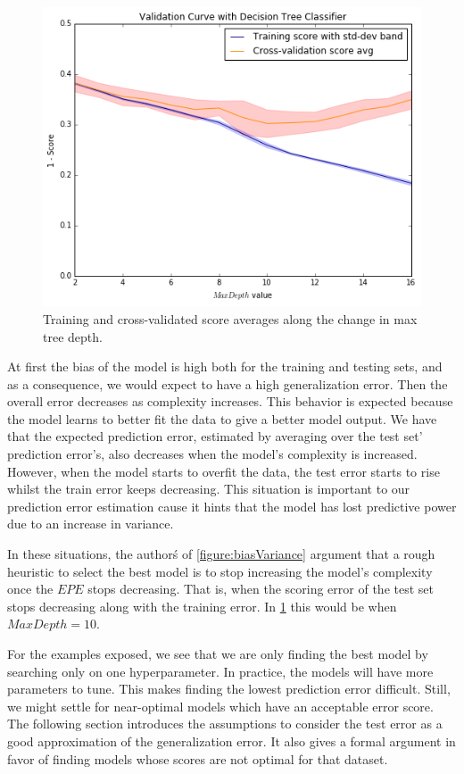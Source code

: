 \begin{figure}[h!]
\begin{center}
\includegraphics[width=0.7\columnwidth]{figures/figure-biasVariance/dtree_overfit_problem_2.png}
\caption{ Training and cross-validated score averages along the change in max tree depth.
}
\label{figure:dtree_overfit_problem_2}
\end{center}
\end{figure}


At first the bias of the model is high both for the training and testing sets, and as a consequence, we would expect to have a high generalization error. Then the overall error decreases as complexity increases. This behavior is expected because the model learns to better fit the data to give a better model output. We have that the expected prediction error, estimated by averaging over the test set' prediction error's, also decreases when the model's complexity is increased. However, when the model starts to overfit the data, the test error starts to rise whilst the train error keeps decreasing. This situation is important to our prediction error estimation cause it hints that the model has lost predictive power due to an increase in variance.

In these situations, the author\'s of \cref{figure:biasVariance} argument that a rough heuristic to select the best model is to stop increasing the model's complexity once the $EPE$ stops decreasing. That is, when the scoring error of the test set stops decreasing along with the training error. In \cref{figure:dtree_overfit_problem_2} this would be when $Max Depth = 10$.

For the examples exposed, we see that we are only finding the best model by searching only on one hyperparameter. In practice, the models will have more parameters to tune. This makes finding the lowest prediction error difficult.
Still, we might settle for near-optimal models which have an acceptable error score. The following section introduces the assumptions to consider the test error as a good approximation of the generalization error. It also gives a formal argument in favor of finding models whose scores are not optimal for that dataset.


